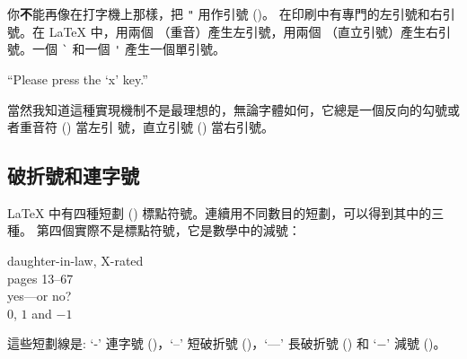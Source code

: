 你{\textbf
不}能再像在打字機上那樣，把 \verb|"| 用作引號 ()。
在印刷中有專門的左引號和右引號。在 \LaTeX{} 中，用兩個 \textasciigrave
（重音）產生左引號，用兩個 \textquotesingle
（直立引號）產生右引號。一個 \verb|`| 和一個 \verb|'| 產生一個單引號。
\begin{example}
``Please press the `x' key.''
\end{example}
當然我知道這種實現機制不是最理想的，無論字體如何，它總是一個反向的勾號或者重音符 (\textasciigrave) 當左引
號，直立引號 (\textquotesingle) 當右引號。

\subsection{破折號和連字號}

\LaTeX{} 中有四種短劃 () 標點符號。連續用不同數目的短劃，可以得到其中的三種。
第四個實際不是標點符號，它是數學中的減號：\index{-} \index{--}
\index{---}  

\begin{example}
daughter-in-law, X-rated\\
pages 13--67\\
yes---or no? \\
$0$, $1$ and $-1$
\end{example}
這些短劃線是:
`-' 連字號 ()，`--' 短破折號 ()，`---' 長破折號 () 
和  `$-$' 減號 ()。

